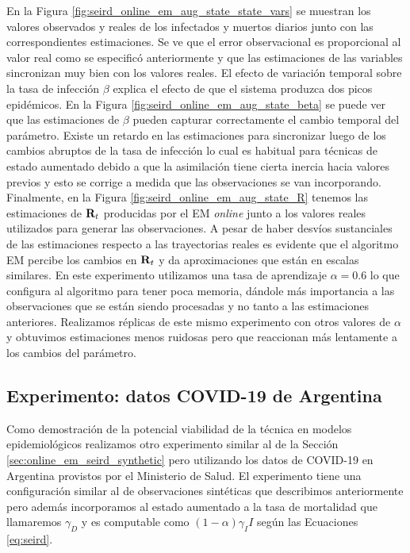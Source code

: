 En la Figura \ref{fig:seird_online_em_aug_state_state_vars} se muestran los valores observados y reales de los infectados y muertos diarios junto con las correspondientes estimaciones. Se ve que el error observacional es proporcional al valor real como se especificó anteriormente y que las estimaciones de las variables sincronizan muy bien con los valores reales. El efecto de variación temporal sobre la tasa de infección $\beta$ explica el efecto de que el sistema produzca dos picos epidémicos. En la Figura \ref{fig:seird_online_em_aug_state_beta} se puede ver que las estimaciones de $\beta$ pueden capturar correctamente el cambio temporal del parámetro. Existe un retardo en las estimaciones para sincronizar luego de los cambios abruptos de la tasa de infección lo cual es habitual para técnicas de estado aumentado debido a que la asimilación tiene cierta inercia hacia valores previos y esto se corrige a medida que las observaciones se van incorporando. Finalmente, en la Figura \ref{fig:seird_online_em_aug_state_R} tenemos las estimaciones de $\mathbf{R}_t$ producidas por el EM \textit{online} junto a los valores reales utilizados para generar las observaciones. A pesar de haber desvíos sustanciales de las estimaciones respecto a las trayectorias reales es evidente que el algoritmo EM percibe los cambios en $\mathbf{R}_t$ y da aproximaciones que están en escalas similares. En este experimento utilizamos una tasa de aprendizaje $\alpha = 0.6$ lo que configura al algoritmo para tener poca memoria, dándole más importancia a las observaciones que se están siendo procesadas y no tanto a las estimaciones anteriores. Realizamos réplicas de este mismo experimento con otros valores de $\alpha$ y obtuvimos estimaciones menos ruidosas pero que reaccionan más lentamente a los cambios del parámetro.

\subsection{Experimento: datos COVID-19 de Argentina}
Como demostración de la potencial viabilidad de la técnica en modelos epidemiológicos realizamos otro experimento similar al de la Sección \ref{sec:online_em_seird_synthetic} pero utilizando los datos de COVID-19 en Argentina provistos por el Ministerio de Salud. El experimento tiene una configuración similar al de observaciones sintéticas que describimos anteriormente pero además incorporamos al estado aumentado a la tasa de mortalidad que llamaremos $\gamma_D$ y es computable como $(1-\alpha) \gamma_I I$ según las Ecuaciones \ref{eq:seird}.

